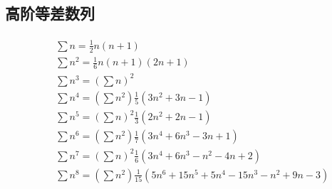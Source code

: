 ﻿\subsection{高阶等差数列}
	\paragraph{}
	\begin{eqnarray}
	&& \sum n = \frac{1}{2}n(n+1)\\
	&& \sum n^2 = \frac{1}{6}n(n+1)(2n+1) \\
	&& \sum n^3 = \left(\sum n\right)^2 \\
	&& \sum n^4 = \left(\sum n^2\right)\frac{1}{5}(3n^2+3n-1)\\
	&& \sum n^5 = \left(\sum n\right)^2\frac{1}{3}(2n^2+2n-1)\\
	&& \sum n^6 = \left(\sum n^2\right)\frac{1}{7}(3n^4+6n^3-3n+1)\\
	&& \sum n^7 = \left(\sum n\right)^2\frac{1}{6}(3n^4+6n^3-n^2-4n+2)\\
	&& \sum n^8 = \left(\sum n^2\right)\frac{1}{15}(5n^6+15n^5+5n^4-15n^3-n^2+9n-3)
	\end{eqnarray}